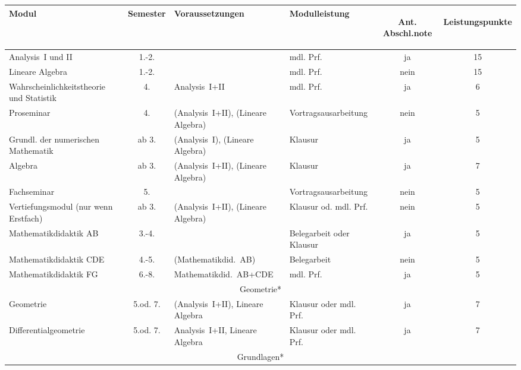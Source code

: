 \begin{table}[tbp]
	\begin{small}
		\begin{tabularx}{\textwidth}{|@{~}X@{~}|@{~}c@{~}|@{~}X@{~}|@{~}X@{~}|@{~}c@{~}|@{~}c@{~}|}
			\hline
			Modul & Semes\-ter & Voraus\-setzungen & Modul\-leistung & \begin{sideways}Ant. Abschl.note\end{sideways} & \begin{sideways}Leistungspunkte\end{sideways}\\\hline\hline
			Analysis~I und II &   1.-2.  &                &   mdl. Prf.   &   ja    &   15\\\hline
			Lineare Algebra &  1.-2.   &         &   mdl. Prf.   &   nein    &   15\\\hline
			Wahr\-schein\-lich\-keits\-theorie und Sta\-tis\-tik&4.&Analysis~I+II&mdl. Prf.&ja&6\\\hline
			Pro\-seminar&4.&(Analy\-sis~I+II), (Lineare Algebra)&Vortrags\-aus\-arbeitung&nein&5\\\hline
			Grundl. der numerischen Mathe\-matik&ab 3.&(Analy\-sis~I), (Lineare Algebra)&Klausur&ja&5\\\hline
			Algebra&ab 3.&(Analy\-sis~I+II), (Lineare Algebra)&Klausur&ja&7\\\hline
			Fach\-seminar&5.&&Vortrags\-aus\-arbeitung&nein&5\\\hline
			Ver\-tiefungs\-modul (nur wenn Erst\-fach)&ab 3.&(Analysis~I+II), (Lineare Algebra)&Klausur od. mdl. Prf.&nein&5\\\hline
			Mathe\-matik\-didaktik AB&3.-4.&&Beleg\-arbeit oder Klausur&ja&5\\\hline
			Mathe\-matik\-didaktik CDE&4.-5.&(Mathe\-matikdid.~AB)&Beleg\-arbeit&nein&5\\\hline
			Mathe\-matik\-didaktik FG&6.-8.&Mathe\-matik\-did.~AB+CDE&mdl. Prf.&ja&5\\\hline\hline
			\multicolumn{6}{|c|}{Geometrie*}\\\hline
			Geometrie&5.od. 7.&(Analysis~I+II), Lineare Algebra&Klausur oder mdl. Prf.&ja&7\\\hline
			Differential\-geometrie&5.od. 7.&Analysis~I+II, Lineare Algebra&Klausur oder mdl. Prf.&ja&7\\\hline\hline
			\multicolumn{6}{|c|}{Grundlagen*}\\\hline

\end{tabularx}
\end{small}
\end{table}
